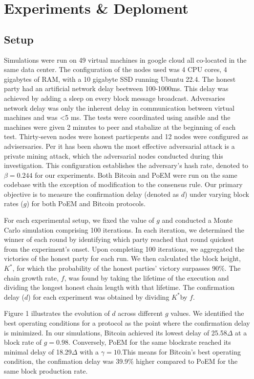 \section{Experiments \& Deploment}\label{sec:experiments}

\subsection{Setup}

Simulations were run on 49 virtual machines in google cloud all co-located in
the same data center. The configuration of the nodes used was 4 CPU cores, 4
gigabytes of RAM, with a 10 gigabyte SSD running Ubuntu 22.4. The honest party
had an artificial network delay beetween 100-1000ms. This delay was achieved by
adding a sleep on every block message broadcast. Adversaries network delay was
only the inherent delay in communication between virtual machines and was <5 ms.
The tests were coordinated using ansible and the machines were given 2 minutes
to peer and stabalize at the beginning of each test. Thirty-seven nodes were
honest particpents and 12 nodes were configured as advisersaries.
Per\cite{eiar} it has been shown the most effective adversarial attack is a
private mining attack, which the adversarial nodes conducted during this
investigation. This configuration establishes the adversary's hash rate, denoted
to $\beta=0.244$ for our experiments. Both Bitcoin and PoEM were run on the same codebase
with the exception of modification to the consensus rule. Our primary objective is to
measure the confirmation delay (denoted as $d$) under varying block rates ($g$)
for both PoEM and Bitcoin protocols.

For each experimental setup, we fixed the value of $g$ and conducted a Monte
Carlo simulation comprising 100 iterations. In each iteration, we determined
the winner of each round by identifying which party reached that round quickest
from the experiment's onset. Upon completing 100 iterations, we aggregated the
victories of the honest party for each run. We then calculated the block
height, $K^*$, for which the probability of the honest parties' victory
surpasses 90\%. The chain growth rate, $f$, was found by taking the lifetime of
the execution and dividing the longest honest chain length with that lifetime.
The confirmation delay ($d$) for each experiment was obtained by dividing
$K^*$by $f$.

Figure 1 illustrates the evolution of $d$ across different $g$ values. We
identified the best operating conditions for a protocol as the point where the
confirmation delay is minimized. In our simulations, Bitcoin achieved its lowest
delay of 25.58$\Delta$ at a block rate of $g=0.98$. Conversely, PoEM for the
same blockrate reached its minimal delay of 18.29$\Delta$ with a
$\gamma=10$.This means for Bitcoin's best operating condition, the confimation
delay was 39.9\% higher compared to PoEM for the same block production rate.

